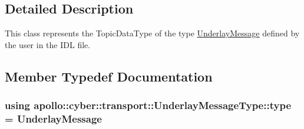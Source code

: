 \subsection{Detailed Description}
This class represents the Topic\-Data\-Type of the type \hyperlink{classapollo_1_1cyber_1_1transport_1_1UnderlayMessage}{Underlay\-Message} defined by the user in the I\-D\-L file. 

\subsection{Member Typedef Documentation}
\hypertarget{classapollo_1_1cyber_1_1transport_1_1UnderlayMessageType_a4b65746e3f848e2f8fcb9c1adef1d84d}{
\subsubsection[{type}]{\setlength{\rightskip}{0pt plus 5cm}using {\bf apollo\-::cyber\-::transport\-::\-Underlay\-Message\-Type\-::type} =  {\bf Underlay\-Message}}}\label{classapollo_1_1cyber_1_1transport_1_1UnderlayMessageType_a4b65746e3f848e2f8fcb9c1adef1d84d}



